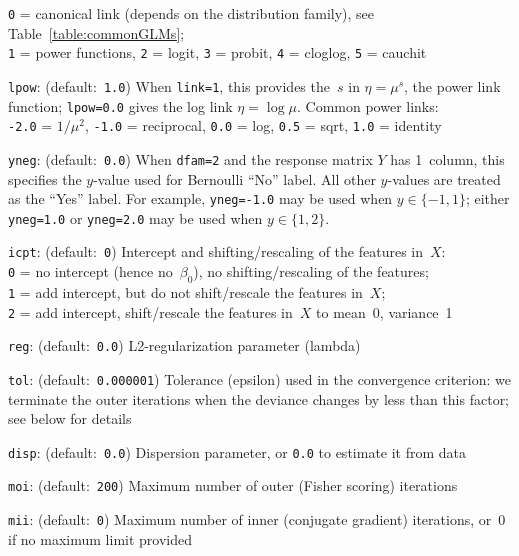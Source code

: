 \begin{Description}
{\tt 0} = canonical link (depends on the distribution family), see Table~\ref{table:commonGLMs};\\
{\tt 1} = power functions,
{\tt 2} = logit,
{\tt 3} = probit,
{\tt 4} = cloglog,
{\tt 5} = cauchit
\item[{\tt lpow}:] (default:\mbox{ }{\tt 1.0})
When {\tt link=1}, this provides the~$s$ in $\eta = \mu^s$, the power link
function; {\tt lpow=0.0} gives the log link $\eta = \log\mu$.  Common power links:\\
{\tt -2.0} = $1/\mu^2$,
{\tt -1.0} = reciprocal,
{\tt 0.0} = log,
{\tt 0.5} = sqrt,
{\tt 1.0} = identity
\item[{\tt yneg}:] (default:\mbox{ }{\tt 0.0})
When {\tt dfam=2} and the response matrix $Y$ has 1~column,
this specifies the $y$-value used for Bernoulli ``No'' label.
All other $y$-values are treated as the ``Yes'' label.
For example, {\tt yneg=-1.0} may be used when $y\in\{-1, 1\}$;
either {\tt yneg=1.0} or {\tt yneg=2.0} may be used when $y\in\{1, 2\}$.
\item[{\tt icpt}:] (default:\mbox{ }{\tt 0})
Intercept and shifting/rescaling of the features in~$X$:\\
{\tt 0} = no intercept (hence no~$\beta_0$), no shifting/rescaling of the features;\\
{\tt 1} = add intercept, but do not shift/rescale the features in~$X$;\\
{\tt 2} = add intercept, shift/rescale the features in~$X$ to mean~0, variance~1
\item[{\tt reg}:] (default:\mbox{ }{\tt 0.0})
L2-regularization parameter (lambda)
\item[{\tt tol}:] (default:\mbox{ }{\tt 0.000001})
Tolerance (epsilon) used in the convergence criterion: we terminate the outer iterations
when the deviance changes by less than this factor; see below for details
\item[{\tt disp}:] (default:\mbox{ }{\tt 0.0})
Dispersion parameter, or {\tt 0.0} to estimate it from data
\item[{\tt moi}:] (default:\mbox{ }{\tt 200})
Maximum number of outer (Fisher scoring) iterations
\item[{\tt mii}:] (default:\mbox{ }{\tt 0})
Maximum number of inner (conjugate gradient) iterations, or~0 if no maximum
limit provided
\end{Description}


